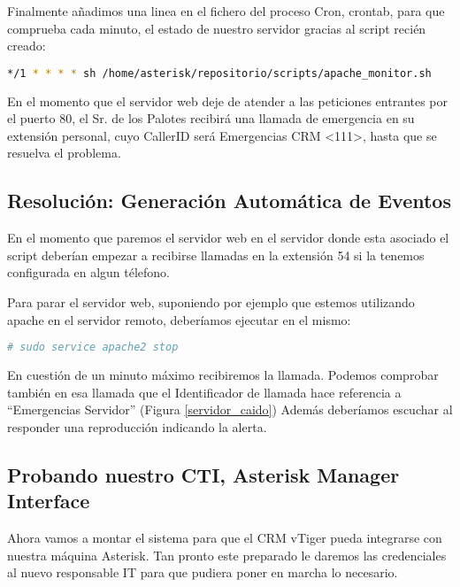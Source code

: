 

Finalmente añadimos una linea en el fichero del proceso Cron, crontab, para que comprueba cada minuto, el estado de nuestro servidor gracias al script recién creado:

\begin{lstlisting}[language=bash,title={/etc/crontab}]
*/1 * * * * sh /home/asterisk/repositorio/scripts/apache_monitor.sh
\end{lstlisting}

En el momento que el servidor web deje de atender a las peticiones entrantes por el puerto 80, el Sr. de los Palotes recibirá una llamada de emergencia en su extensión personal, cuyo CallerID será Emergencias CRM <111>, hasta que se resuelva el problema.

\subsection{Resolución: Generación Automática de Eventos}

En el momento que paremos el servidor web en el servidor donde esta asociado el script deberían empezar a recibirse llamadas en la extensión 54 si la tenemos configurada en algun télefono.

Para parar el servidor web, suponiendo por ejemplo que estemos utilizando apache en el servidor remoto, deberíamos ejecutar en el mismo:

\begin{lstlisting}[language=sh]
# sudo service apache2 stop
\end{lstlisting}

En cuestión de un minuto máximo recibiremos la llamada. Podemos comprobar también en esa llamada que el Identificador de llamada hace referencia a ``Emergencias Servidor'' (Figura \ref{servidor_caido}) Además deberíamos escuchar al responder una reproducción indicando la alerta.


\newpage

\subsection{Probando nuestro CTI, Asterisk Manager Interface}

Ahora vamos a montar el sistema para que el CRM vTiger pueda integrarse con nuestra máquina Asterisk. Tan pronto este preparado le daremos las credenciales al nuevo responsable IT para que pudiera poner en marcha lo necesario.

